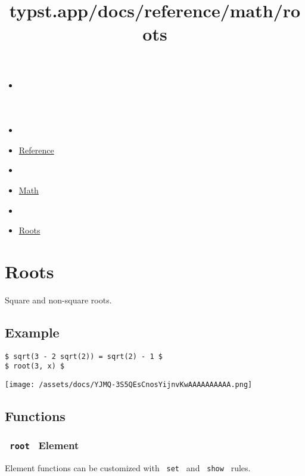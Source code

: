 \title{typst.app/docs/reference/math/roots}

\begin{itemize}
\tightlist
\item
  \href{/docs}{}
\item
  
\item
  \href{/docs/reference/}{Reference}
\item
  
\item
  \href{/docs/reference/math/}{Math}
\item
  
\item
  \href{/docs/reference/math/roots}{Roots}
\end{itemize}

\section{Roots}\label{summary}

Square and non-square roots.

\subsection{Example}\label{example}

\begin{verbatim}
$ sqrt(3 - 2 sqrt(2)) = sqrt(2) - 1 $
$ root(3, x) $
\end{verbatim}

\texttt{[image: /assets/docs/YJMQ-3S5QEsCnosYijnvKwAAAAAAAAAA.png]}

\subsection{Functions}\label{functions}

\subsubsection{\texorpdfstring{\texttt{\ root\ } {{ Element
}}}{ root   Element }}\label{functions-root}

\label{functions-root-element-tooltip}
Element functions can be customized with \texttt{\ set\ } and
\texttt{\ show\ } rules.

